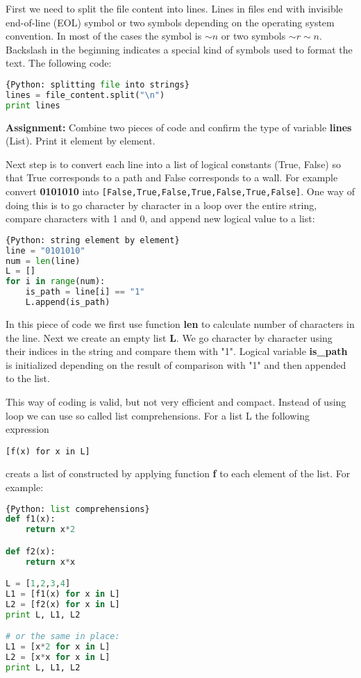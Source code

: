 First we need to split the file content into lines. Lines in files
end with invisible end-of-line (EOL) symbol or two 
symbols depending on the
operating system convention. In most of the cases
the symbol is \textbf{$\sim n$} or two symbols \textbf{$\sim r\sim n$}.
Backslash in the beginning indicates a special
kind of symbols used to format the text. The following code:

\begin{lstlisting}[language=Python,style=codelst]{Python: splitting file into strings}
lines = file_content.split("\n")
print lines
\end{lstlisting}

\begin{tcolorbox}
\textbf{Assignment:}
Combine two pieces of code and confirm the type of 
variable \textbf{lines} (List).
Print it element by element.
\end{tcolorbox}

Next step is to convert each line into a 
list of logical constants (True, False)
so that True corresponds to a path and False 
corresponds to a wall. For example
convert \textbf{0101010} into 
\lstinline{[False,True,False,True,False,True,False]}. One way of doing
this is to go character by character in a loop over the entire string,
compare characters with 1 and 0, and append new logical value to a list:

\begin{lstlisting}[language=Python,style=codelst]{Python: string element by element}
line = "0101010"
num = len(line)
L = []
for i in range(num):
    is_path = line[i] == "1"
    L.append(is_path)
\end{lstlisting}
In this piece of code we first use function \textbf{len} to calculate
number of characters in the line. Next we create an empty list \textbf{L}.
We go character by character using their indices in the string
and compare them with "1". Logical variable 
\textbf{is\_path} is initialized
depending on the result of comparison with "1" and then appended to 
the list.

This way of coding is valid, but not very efficient and compact.
Instead of using loop we can use so called list comprehensions. For
a list L the following expression

\bigskip
\lstinline{[f(x) for x in L]}
\bigskip

creats a list of constructed by applying 
function \textbf{f} to each element
of the list. For example:

\begin{lstlisting}[language=Python,style=codelst]{Python: list comprehensions}
def f1(x):
    return x*2

def f2(x):
    return x*x

L = [1,2,3,4]
L1 = [f1(x) for x in L]
L2 = [f2(x) for x in L]
print L, L1, L2

# or the same in place:
L1 = [x*2 for x in L]
L2 = [x*x for x in L]
print L, L1, L2
\end{lstlisting}

